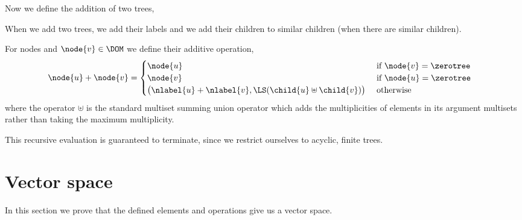 Now we define the addition of two trees,
\begin{definition}
  \label{treeaddition}
  When we add two trees, we add their labels and we add their children
  to similar children (when there are similar children).  

  For nodes  and $\node{v} \in \DOM$ we define their additive operation,
  \begin{align*}
    \node{u} + \node{v} &= \begin{cases}
      \node{u} &\text{ if } \node{v} = \zerotree \\
      \node{v} &\text{ if } \node{u} = \zerotree \\
      \bigl(\nlabel{u} + \nlabel{v}, \LS(\child{u} \uplus \child{v})\bigr) & \text{ otherwise}
    \end{cases}
  \end{align*}
  where the operator $\uplus$ is the standard multiset summing union operator
  which adds the multiplicities of elements in its argument multisets rather than taking
  the maximum multiplicity.

  This recursive evaluation is guaranteed to terminate, since we restrict
  ourselves to acyclic, finite trees.
\end{definition}

\section{Vector space}
In this section we prove that the defined elements and operations give
us a vector space.  

